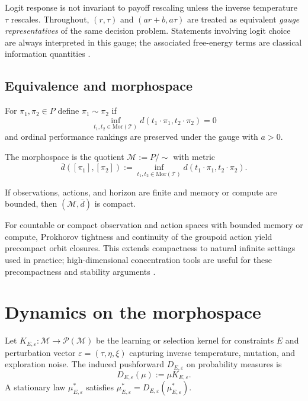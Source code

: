 \documentclass[11pt]{article}
\newcommand{\1}{\mathbbm{1}}
\begin{document}
\begin{remark}
Logit response is not invariant to payoff rescaling unless the inverse temperature $\tau$ rescales. Throughout, $(r,\tau)$ and $(a r + b, a \tau)$ are treated as equivalent \emph{gauge representatives} of the same decision problem. Statements involving logit choice are always interpreted in this gauge; the associated free-energy terms are classical information quantities \parencite{CoverThomas2006}.
\end{remark}

\subsection{Equivalence and morphospace}
\begin{definition}[Equivalence]
For $\pi_1,\pi_2 \in P$ define $\pi_1 \sim \pi_2$ if
\[
\inf_{t_1,t_2 \in \mathrm{Mor}(\mathcal{T})} d(t_1 \cdot \pi_1, t_2 \cdot \pi_2) = 0
\]
and ordinal performance rankings are preserved under the gauge with $a>0$.
\end{definition}

\begin{definition}
The morphospace is the quotient $\mathcal{M} := P /\!\sim$ with metric
\[
\bar d([\pi_1],[\pi_2]) := \inf_{t_1,t_2 \in \mathrm{Mor}(\mathcal{T})} d(t_1 \cdot \pi_1, t_2 \cdot \pi_2).
\]
\end{definition}

\begin{lemma}
If observations, actions, and horizon are finite and memory or compute are bounded, then $(\mathcal{M},\bar d)$ is compact.
\end{lemma}

\begin{remark}
For countable or compact observation and action spaces with bounded memory or compute, Prokhorov tightness and continuity of the groupoid action yield precompact orbit closures. This extends compactness to natural infinite settings used in practice; high-dimensional concentration tools are useful for these precompactness and stability arguments \parencite{VanHandel2014}.
\end{remark}

\section{Dynamics on the morphospace}
Let $K_{E,\varepsilon}:\mathcal{M} \to \mathcal{P}(\mathcal{M})$ be the learning or selection kernel for constraints $E$ and perturbation vector $\varepsilon = (\tau,\eta,\xi)$ capturing inverse temperature, mutation, and exploration noise. The induced pushforward $D_{E,\varepsilon}$ on probability measures is
\[
D_{E,\varepsilon}(\mu) := \mu K_{E,\varepsilon}.
\]
A stationary law $\mu^*_{E,\varepsilon}$ satisfies $\mu^*_{E,\varepsilon} = D_{E,\varepsilon}(\mu^*_{E,\varepsilon})$.
\end{document}

